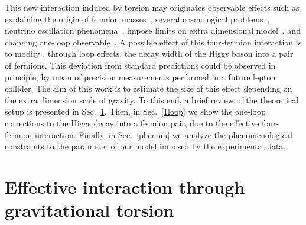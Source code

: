 \documentclass{ws-mpla}
\renewcommand{\(}{\left(}
\renewcommand{\)}{\right)}
\renewcommand{\[}{\left[}
\renewcommand{\]}{\right]}
\begin{document}


This new interaction induced by torsion may originates observable effects\cite{Belyaev:1997zv,Belyaev:1998ax,Belyaev:2007fn} such as explaining the origin of fermion masses~\cite{Castillo-Felisola:2013jva}, several cosmological problems~\cite{Puetzfeld:2004yg,Capozziello:2009mq,Poplawski:2010jv,Poplawski:2010kb,Poplawski:2011xf,Poplawski:2011wj,Fabbri:2012yg,Vignolo:2014wva}, neutrino oscillation phenomena~\cite{Capozziello:2013dja}, impose limits on extra dimensional model~\cite{Chang:2000yw,Lebedev:2002dp,CCSZ,Castillo-Felisola:2014iia}, and changing one-loop observable~\cite{Castillo-Felisola:2014xba}. A possible  effect of this four-fermion interaction is to modify , through loop effects, the decay width of the Higgs boson into a pair of fermions. This deviation from standard predictions could be observed in principle, by mean of precision measurements performed in a future lepton collider. The  aim of this work is to estimate the size of this effect depending on the extra dimension scale of gravity. To this end, a brief review of the theoretical setup is presented in Sec.~\ref{CEG}. Then, in Sec.~\ref{1loop} we show the one-loop corrections to the Higgs decay into a fermion pair, due to the effective four-fermion interaction. Finally, in Sec.~\ref{phenom} we analyze the phenomenological constraints to the parameter of our model imposed by the experimental data.



\section{Effective interaction through gravitational torsion}\label{CEG}
\end{document}
